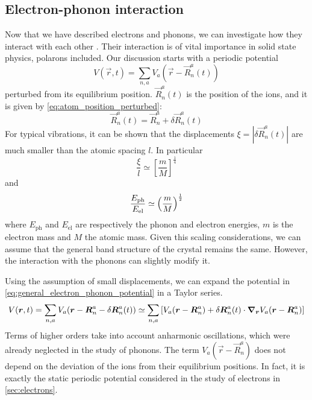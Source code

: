 \subsection{Electron-phonon interaction} \label{sec:electrons_phonons_interaction}
Now that we have described electrons and phonons, we can investigate how they interact with each other \cite{cohenFundamentalsCondensedMatter, tempere}. Their interaction is of vital importance in solid state physics, polarons included. Our discussion starts with a periodic potential
\begin{equation} \label{eq:general_electron_phonon_potential}
    V(\vec{r}, t) = \sum_{n,a} V_a(\vec{r} - \vec{R}_n^a(t))
\end{equation}
perturbed from its equilibrium position. $\vec{R}_n^a(t)$ is the position of the ions, and it is given by \cref{eq:atom_position_perturbed}:
\begin{equation}
    \vec{R}_n^a(t) = \vec{R}_n^a + \delta \vec{R}_n^a(t)
\end{equation}
For typical vibrations, it can be shown that the displacements $\xi = |\delta \vec{R}_n^a(t)|$ are much smaller than the atomic spacing $l$. In particular
\begin{equation}
    \frac{\xi}{l} \simeq \left[ \frac{m}{M} \right]^\frac{1}{4}
\end{equation}
and
\begin{equation}
    \frac{E_\text{ph}}{E_\text{el}} \simeq \left( \frac{m}{M} \right)^{\frac{1}{2}}
\end{equation}
where $E_\text{ph}$ and $E_\text{el}$ are respectively the phonon and electron energies, $m$ is the electron mass and $M$ the atomic mass. Given this scaling considerations, we can assume that the general band structure of the crystal remains the same. However, the interaction with the phonons can slightly modify it.

Using the assumption of small displacements, we can expand the potential in \cref{eq:general_electron_phonon_potential} in a Taylor series.
\begin{multline}
    V(\mathbf{\boldsymbol{r}}, t) = \sum_{n,a} V_a(\mathbf{\boldsymbol{r}} - \mathbf{\boldsymbol{R}}_n^a - \delta \mathbf{\boldsymbol{R}}_n^a(t))
    \simeq \sum_{n,a} \left[ V_a(\mathbf{\boldsymbol{r}} - \mathbf{\boldsymbol{R}}_n^a) + \delta \mathbf{\boldsymbol{R}}_n^a(t) \cdot \grad_{\mathbf{\boldsymbol{r}}} V_a(\mathbf{\boldsymbol{r}} - \mathbf{\boldsymbol{R}}_n^a) \right]
\end{multline}
Terms of higher orders take into account anharmonic oscillations, which were already neglected in the study of phonons. The term $V_a(\vec{r} - \vec{R}_n^a)$ does not depend on the deviation of the ions from their equilibrium positions. In fact, it is exactly the static periodic potential considered in the study of electrons in \cref{sec:electrons}.

